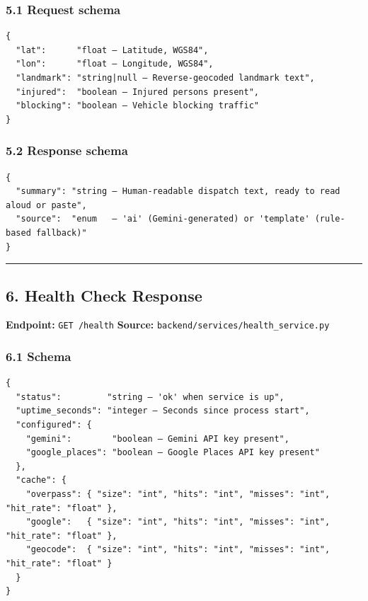 \hypertarget{request-schema-1}{%
\subsubsection{5.1 Request schema}\label{request-schema-1}}

\begin{verbatim}
{
  "lat":      "float — Latitude, WGS84",
  "lon":      "float — Longitude, WGS84",
  "landmark": "string|null — Reverse-geocoded landmark text",
  "injured":  "boolean — Injured persons present",
  "blocking": "boolean — Vehicle blocking traffic"
}
\end{verbatim}

\hypertarget{response-schema-1}{%
\subsubsection{5.2 Response schema}\label{response-schema-1}}

\begin{verbatim}
{
  "summary": "string — Human-readable dispatch text, ready to read aloud or paste",
  "source":  "enum   — 'ai' (Gemini-generated) or 'template' (rule-based fallback)"
}
\end{verbatim}

\begin{center}\rule{0.5\linewidth}{0.5pt}\end{center}

\hypertarget{health-check-response}{%
\subsection{6. Health Check Response}\label{health-check-response}}

\textbf{Endpoint:} \texttt{GET\ /health} \textbf{Source:}
\texttt{backend/services/health\_service.py}

\hypertarget{schema-3}{%
\subsubsection{6.1 Schema}\label{schema-3}}

\begin{verbatim}
{
  "status":         "string — 'ok' when service is up",
  "uptime_seconds": "integer — Seconds since process start",
  "configured": {
    "gemini":        "boolean — Gemini API key present",
    "google_places": "boolean — Google Places API key present"
  },
  "cache": {
    "overpass": { "size": "int", "hits": "int", "misses": "int", "hit_rate": "float" },
    "google":   { "size": "int", "hits": "int", "misses": "int", "hit_rate": "float" },
    "geocode":  { "size": "int", "hits": "int", "misses": "int", "hit_rate": "float" }
  }
}
\end{verbatim}

